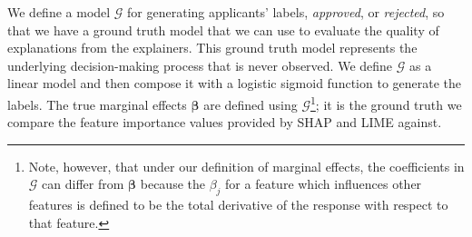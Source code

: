\documentclass[12pt]{article}  %
\begin{document}
\begin{table}[h]
\centering
{}
\caption{Description of features for simulated loan data.}
\label{tab:simulated}
\end{table}



   We define a model $\mathcal{G}$ for generating applicants' labels, \textit{approved}, or \textit{rejected}, so that we have a ground truth model that we can use to evaluate the quality of explanations from the explainers. This ground truth model represents the underlying decision-making process that is never observed.  We define $\mathcal{G}$ as a linear model and then compose it with a logistic sigmoid function to generate the labels. The true marginal effects $\boldsymbol{\beta}$ are defined using $\mathcal{G}$\footnote{Note, however, that under our definition of marginal effects, the coefficients in $\mathcal{G}$ can differ from $\boldsymbol{\beta}$ because the $\beta_j$ for a feature which influences other features is defined to be the total derivative of the response with respect to that feature.}; it is the ground truth we compare the feature importance values provided by SHAP and LIME against.
   
\end{document}
